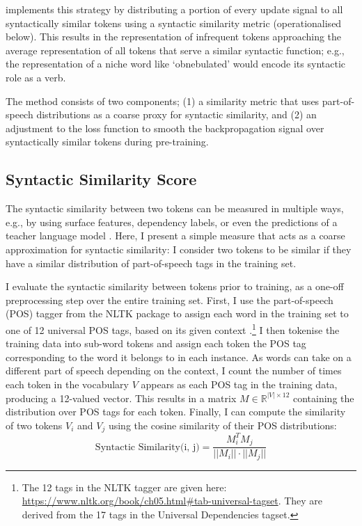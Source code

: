 \smoothing implements this strategy by distributing a portion of every update signal to all syntactically similar tokens using a syntactic similarity metric (operationalised below). This results in the representation of infrequent tokens approaching the average representation of all tokens that serve a similar syntactic function; e.g., the representation of a niche word like `obnebulated' would encode its syntactic role as a verb.

The \smoothing method consists of two components; (1) a similarity metric that uses part-of-speech distributions as a coarse proxy for syntactic similarity, and (2) an adjustment to the loss function to smooth the backpropagation signal over syntactically similar tokens during pre-training. 

\subsection{Syntactic Similarity Score}
\label{sec:sim}

The syntactic similarity between two tokens can be measured in multiple ways, e.g., by using surface features, dependency labels, or even the predictions of a teacher language model \citep{hinton2015distilling}. Here, I present a simple measure that acts as a coarse approximation for syntactic similarity: I consider two tokens to be similar if they have a similar distribution of part-of-speech tags in the training set.

I evaluate the syntactic similarity between tokens prior to training, as a one-off preprocessing step over the entire training set. First, I use the part-of-speech (POS) tagger from the NLTK package \citep{bird2009natural} to assign each word in the training set to one of 12 universal POS tags, based on its given context \citep{petrov2012universalpos}.\footnote{The 12 tags in the NLTK tagger are given here: \url{https://www.nltk.org/book/ch05.html\#tab-universal-tagset}. They are derived from the 17 tags in the Universal Dependencies tagset.} I then tokenise the training data into sub-word tokens and assign each token the POS tag corresponding to the word it belongs to in each instance. As words can take on a different part of speech depending on the context, I count the number of times each token in the vocabulary $V$ appears as each POS tag in the training data, producing a 12-valued vector. This results in a matrix $M \in \mathbb{R}^{|V|\times 12}$ containing the distribution over POS tags for each token. Finally, I can compute the similarity of two tokens $V_i$ and $V_j$ using the cosine similarity of their POS distributions: $$ \text{Syntactic Similarity(i, j)} = \frac{M_i^TM_j}{||M_i|| \cdot ||M_j||}$$ 


